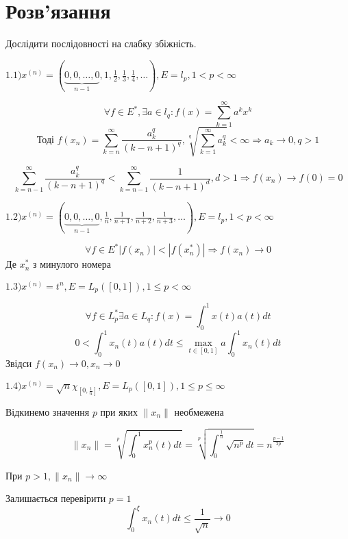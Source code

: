 \section*{Розв'язання}


\begin{tcolorbox}[title=Завдлання 1]
    Дослідити послідовності на слабку збіжність.

    $
    1.1) x^{(n)}=(\underbrace{0,0, \ldots, 0}_{n-1}, 1, \frac{1}{2},
    \frac{1}{3}, \frac{1}{4}, \ldots), E=l_{p}, 1<p<\infty $


    $$\forall f \in E^*, \exists a \in l_q: f(x) = 
    \sum_{k=1}^\infty a^k x^k$$
    $$\text{Тоді } f(x_n) = \sum_{k = n}^{\infty} \frac{a_k^q}{(k - n + 1)^q},
    \sqrt[q]{\sum_{k=1}^{\infty} a_k^q} < \infty \Rightarrow a_k \rightarrow 0, 
    q > 1$$

    $$ \sum_{k=n-1}^{\infty}  \frac{a_k^q}{(k - n + 1)^q} < 
    \sum_{k=n-1}^{\infty}  \frac{1}{(k - n + 1)^d}, d>1 \Rightarrow f(x_n) \rightarrow
    f(0) = 0 $$


    $
    1.2) x^{(n)}=(\underbrace{0,0, \ldots, 0}_{n-1}, \frac{1}{n}, 
    \frac{1}{n+1}, \frac{1}{n+2}, \frac{1}{n+3}, \ldots), E=l_{p}, 1<p<\infty
    $

    $$\forall f \in E^* |f(x_n)| < |f(x_n^*)| 
    \Rightarrow f(x_n) \rightarrow 0$$
    Де $x_n^*$ з минулого номера 

    $
    1.3) x^{(n)}=t^{n}, E=L_{p}([0,1]), 1 \leq p<\infty
    $

    $$ \forall f \in L_p^* \exists a \in L_q: f(x)=\int_{0}^{1} x(t)a(t)dt $$
    $$ 0 < \int_{0}^{1} x_n(t)a(t)dt \le \max_{t \in [0, 1]} a \int_{0}^{1} x_n(t)dt $$
    Звідси $f(x_n) \rightarrow 0, x_n \rightarrow 0$


    $
    1.4) x^{(n)}=\sqrt{n} \chi_{[0, \frac{1}{n}]}, E=L_{p}([0,1]), 1 \leq p \leq \infty
    $

    Відкинемо значення $p$ при яких $\|x_n\|$ необмежена 

    $$ \|x_n\| = \sqrt[p]{\int_{0}^{1}x_n^p(t) dt} = 
    \sqrt[p]{\int_{0}^{\frac{1}{n}} \sqrt{n^p}dt } =
    n^{\frac{p - 1}{2p}} $$

    При $p>1, \|x_n\| \rightarrow \infty$


    Залишається перевірити $p = 1$
    $$\int_{0}^{\xi} x_n(t)dt \le \frac{1}{\sqrt{n}} \rightarrow 0$$

\end{tcolorbox}

